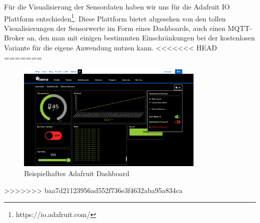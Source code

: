 Für die Visualisierung der Sensordaten haben wir uns für die Adafruit IO Plattform entschieden\footnote{https://io.adafruit.com/}. Diese Plattform bietet abgesehen von den tollen Visualisierungen der Sensorwerte im Form eines Dashboards, auch einen MQTT-Broker an, den man mit einigen bestimmten Einschränkungen bei der kostenlosen Variante für die eigene Anwendung nutzen kann. 
<<<<<<< HEAD
=======

\begin{figure}[h]
	 \centering
	 \includegraphics[width=0.8\textwidth]{pictures/adafruitdashboard}
	 \caption[Beispielhaftes Adafruit Dashboard]{Beispielhaftes Adafruit Dashboard\cite{adafruitdash}}
	 \label{fig:adafruitdashboard}
\end{figure}
>>>>>>> baa7d21123956ad552f736e3f4632aba95a834ca
